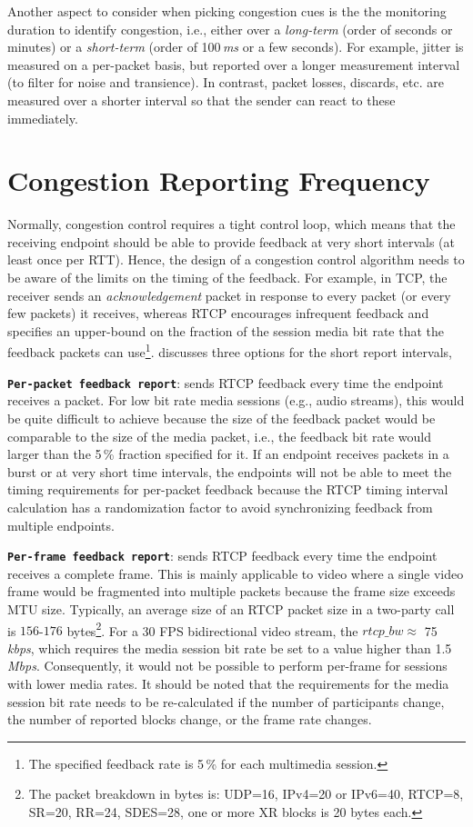 Another aspect to consider when picking congestion cues is the the monitoring
duration to identify congestion, i.e., either over a \emph{long-term} (order
of seconds or minutes) or a \emph{short-term} (order of 100\,\emph{ms} or a
few seconds). For example, jitter is measured on a per-packet basis, but
reported over a longer measurement interval (to filter for noise and
transience). In contrast, packet losses, discards, etc. are measured over a
shorter interval so that the sender can react to these immediately.

\section{Congestion Reporting Frequency}
\label{fw.freq}

Normally, congestion control requires a tight control loop, which means that
the receiving endpoint should be able to provide feedback at very short
intervals (at least once per RTT). Hence, the design of a congestion control
algorithm needs to be aware of the limits on the timing of the feedback. For
example, in TCP, the receiver sends an \emph{acknowledgement} packet in
response to every packet (or every few packets) it receives, whereas RTCP
encourages infrequent feedback and specifies an upper-bound on the fraction of
the session media bit rate that the feedback packets can use\footnote{The
specified feedback rate is 5\,\% for each multimedia session.}.
\cite{draft.rmcat.feedback} discusses three options for the short report
intervals,

\textbf{\texttt{Per-packet feedback report}}: sends RTCP feedback every time
the endpoint receives a packet. For low bit rate media sessions (e.g., audio
streams), this would be quite difficult to achieve because the size of the
feedback packet would be comparable to the size of the media packet, i.e., the
feedback bit rate would larger than the 5\,\% fraction specified for it. If an
endpoint receives packets in a burst or at very short time intervals, the
endpoints will not be able to meet the timing requirements for per-packet
feedback because the RTCP timing interval calculation has a randomization
factor to avoid synchronizing feedback from multiple endpoints.

\textbf{\texttt{Per-frame feedback report}}: sends RTCP feedback every time
the endpoint receives a complete frame. This is mainly applicable to video
where a single video frame would be fragmented into multiple packets because
the frame size exceeds MTU size. Typically, an average size of an RTCP packet
size in a two-party call is $156$-$176$ bytes\footnote{The packet breakdown in
bytes is: UDP=16, IPv4=20 or IPv6=40, RTCP=8, SR=20, RR=24, SDES=28, one or
more XR blocks is 20 bytes each.}. For a 30 FPS bidirectional video stream, the
$rtcp\_bw \approx$ 75\,\emph{kbps}, which requires the media session bit rate
be set to a value higher than 1.5\,\emph{Mbps}. Consequently, it would not be
possible to perform per-frame for sessions with lower media rates. It should
be noted that the requirements for the media session bit rate needs to be 
re-calculated if the number of participants change, the number of reported
blocks change, or the frame rate changes.

